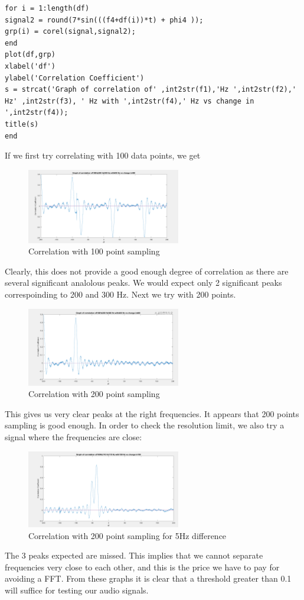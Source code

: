 \begin{itemize}
\begin{lstlisting}
for i = 1:length(df)
signal2 = round(7*sin(((f4+df(i))*t) + phi4 ));
grp(i) = corel(signal,signal2);
end
plot(df,grp)
xlabel('df')
ylabel('Correlation Coefficient')
s = strcat('Graph of correlation of' ,int2str(f1),'Hz ',int2str(f2),' Hz' ,int2str(f3), ' Hz with ',int2str(f4),' Hz vs change in ',int2str(f4));
title(s)
end
\end{lstlisting}
If we first try correlating with 100 data points, we get 
\begin{figure}[ht]
    \centering
    \includegraphics[width=0.6\textwidth]{fig/Graph2100pts.PNG}
    \caption{Correlation with 100 point sampling}
    \label{fig:100pts}
\end{figure}
Clearly, this does not provide a good enough degree of correlation as there are
several significant analolous peaks. We would expect only 2 significant peaks
correspoinding to 200 and 300 Hz. Next we try with 200 points. 
\begin{figure}[ht]
    \centering
    \includegraphics[width=0.6\textwidth]{fig/Graph1.PNG}
    \caption{Correlation with 200 point sampling}
    \label{fig:100pts}
\end{figure}
This gives us very clear peaks at the right frequencies. It appears that 200
points sampling is good enough. In order to check the resolution limit, we also
try a signal where the frequencies are close: 
\begin{figure}[ht]
    \centering
    \includegraphics[width=0.6\textwidth]{fig/LowResolutionGraph3200ots.PNG}
    \caption{Correlation with 200 point sampling for 5Hz difference}
    \label{fig:200ptslowres}
\end{figure}
The 3 peaks expected are missed. This implies that we cannot separate
frequencies very close to each other, and this is the price we have to pay for
avoiding a FFT. From these graphs it is clear that a threshold greater than 0.1
will suffice for testing our audio signals. 

\end{itemize}